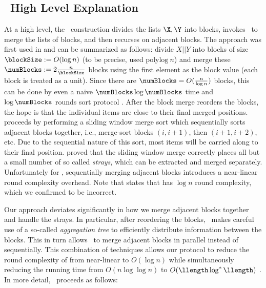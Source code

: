 \subsection{\ourapproach\ High Level Explanation}\label{sec:ourapproachoverview}
At a high level, the \ourprotocol\ construction divides the lists $\X,\Y$ into blocks, invokes \mergeinvprotocol\ to merge the lists of blocks, and then recurses on adjacent blocks. The approach was first used in \cite{ITC:FalOst21} and can be summarized as follows: divide $X||Y$ into blocks of size $\blockSize:=O(\log n)$ (to be precise, \cite{ITC:FalOst21} used $\mathrm{polylog\ } n$) and merge these $\numBlocks:=2\frac{n}{\blockSize}$ blocks using the first element as the block value (each block is treated as a unit). Since there are $\numBlocks=O(\frac{n}{\log n})$ blocks, this can be done by even a naive $\numBlocks \log \numBlocks$ time and $\log\numBlocks$ rounds sort protocol%
. After the block merge reorders the blocks, the hope is that the individual items are close to their final merged positions. \cite{ITC:FalOst21} proceeds by performing a sliding window merge sort which sequentially sorts adjacent blocks together, i.e., merge-sort blocks $(i,i+1)$, then $(i+1,i+2)$, etc. Due to the sequential nature of this sort, most items will be carried along to their final position. \cite{ITC:FalOst21} proved that the sliding window merge correctly places all but a small number of so called \emph{strays}, which can be extracted and merged separately. Unfortunately for \cite{ITC:FalOst21}, sequentially merging adjacent blocks introduces a near-linear round complexity overhead. Note that \cite{EPRINT:BBDLO22} states that \cite{ITC:FalOst21} has $\log n$ round complexity, which we confirmed to be incorrect.%

Our approach deviates significantly in how we merge adjacent blocks together and handle the strays. In particular, after reordering the blocks, \ourprotocol\ makes careful use of a so-called \emph{aggregation tree} \cite{CCS:BDGRR22} to efficiently distribute information between the blocks. This in turn allows \ourprotocol\ to merge adjacent blocks in parallel instead of sequentially. This combination of techniques allows our protocol to reduce the round complexity of  \cite{ITC:FalOst21} from near-linear to $O(\log n)$ while simultaneously reducing the running time from $O(n\log\log n)$ to $O(\llength \log^{*}\llength)$%
. In more detail, \ourprotocol\ proceeds as follows:

